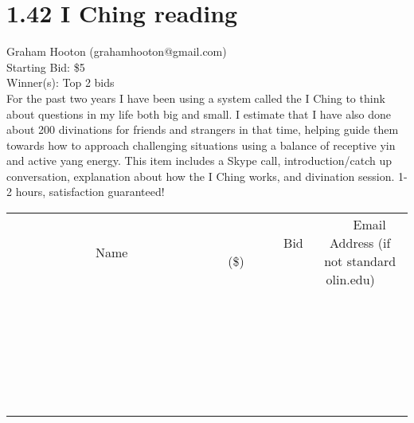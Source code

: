 \documentclass[11pt]{article}
\begin{document}
\section*{1.42 I Ching reading}
Graham Hooton (grahamhooton@gmail.com) \\
Starting Bid: \$5 \\
Winner(s): 
Top 2 bids \\
For the past two years I have been using a system called the I Ching to think about questions in my life both big and small. I estimate that I have also done about 200 divinations for friends and strangers in that time, helping guide them towards how to approach challenging situations using a balance of receptive yin and active yang energy.
This item includes a Skype call, introduction/catch up conversation, explanation about how the I Ching works, and divination session. 1-2 hours, satisfaction guaranteed! \\[6ex]
\begin{tabular}{c c c}
~~~~~~~~~~~~~Name~~~~~~~~~~~~~ & ~~~~~~~~~Bid (\$)~~~~~~~~~ & ~~~Email Address (if not standard olin.edu)~~~ \\
 & & \\
\hline
 & & \\
\hline
 & & \\
\hline
 & & \\
\hline
 & & \\
\hline
 & & \\
\hline
 & & \\
\hline
 & & \\
\hline
 & & \\
\hline
 & & \\
\hline
 & & \\
\hline
 & & \\
\hline
 & & \\
\hline
 & & \\
\hline
 & & \\
\hline
 & & \\
\hline
 & & \\
\hline
 & & \\
\hline
 & & \\
\hline
 & & \\
\hline
 & & \\
\hline
 & & \\
\hline
 & & \\
\hline
 & & \\
\hline
 & & \\
\hline
 & & \\
\hline
\end{tabular}
\clearpage
\end{document}

